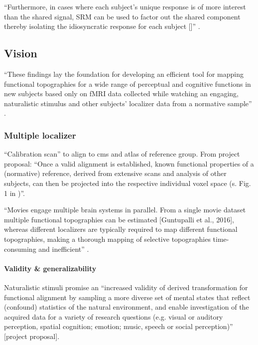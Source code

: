 %
``Furthermore, in cases where each subject's unique response is of more interest
than the shared signal, SRM can be used to factor out the shared component
thereby isolating the idiosyncratic response for each subject
[\citep{chen2015reduced}]'' \citep{kumar2020brainiak}.





\subsection{Vision}


``These findings lay the foundation for developing an
efficient tool for mapping functional topographies for a wide range of
perceptual and cognitive functions in new subjects based only on fMRI data
collected while watching an engaging, naturalistic stimulus and other subjects'
localizer data from a normative sample'' \citep{jiahui2020predicting}.


\subsubsection{Multiple localizer}

``Calibration scan'' to align to \ac{cms} and atlas of reference group.
%
From project proposal: ``Once a valid alignment is established, known functional
properties of a (normative) reference, derived from extensive scans and analysis
of other subjects, can then be projected into the respective individual voxel
space (s.  Fig. 1 in \citep{nishimoto2016lining})''.

%
``Movies engage multiple brain systems in parallel. From a single movie dataset
multiple functional topographies can be estimated [Guntupalli et al., 2016],
whereas different localizers are typically required to map different functional
topographies, making a thorough mapping of selective topographies time-consuming
and inefficient'' \citep{jiahui2020predicting}.


\paragraph{Validity \& generalizability}

Naturalistic stimuli promise an ``increased validity of derived transformation
for functional alignment by sampling a more diverse set of mental states that
reflect (confound) statistics of the natural environment, and enable
investigation of the acquired data for a variety of research questions (e.g.
visual or auditory perception, spatial cognition; emotion; music, speech or
social perception)'' [project proposal].

